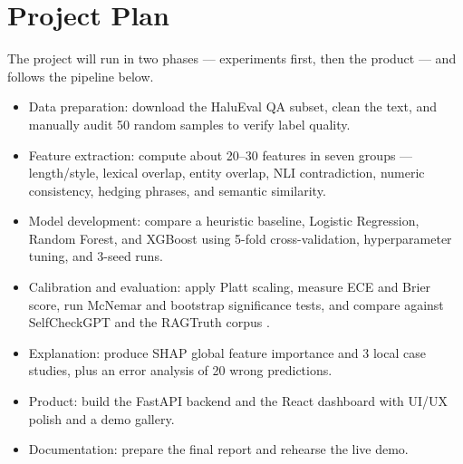 \documentclass[12pt,a4paper]{article}
\begin{document}
\section{Project Plan}

The project will run in two phases --- experiments first, then the product --- and follows the pipeline below.

\begin{itemize}
    \item Data preparation: download the HaluEval QA subset, clean the text, and manually audit 50 random samples to verify label quality.
    \item Feature extraction: compute about 20--30 features in seven groups --- length/style, lexical overlap, entity overlap, NLI contradiction, numeric consistency, hedging phrases, and semantic similarity.
    \item Model development: compare a heuristic baseline, Logistic Regression, Random Forest, and XGBoost using 5-fold cross-validation, hyperparameter tuning, and 3-seed runs.
    \item Calibration and evaluation: apply Platt scaling, measure ECE and Brier score, run McNemar and bootstrap significance tests, and compare against SelfCheckGPT \cite{selfcheck} and the RAGTruth corpus \cite{ragtruth}.
    \item Explanation: produce SHAP global feature importance and 3 local case studies, plus an error analysis of 20 wrong predictions.
    \item Product: build the FastAPI backend and the React dashboard with UI/UX polish and a demo gallery.
    \item Documentation: prepare the final report and rehearse the live demo.
\end{itemize}

\newpage
\end{document}
